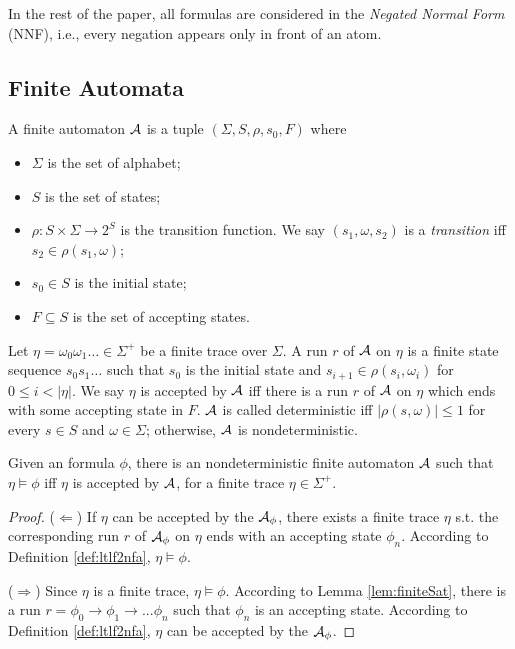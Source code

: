 In the rest of the paper, all \ltlf formulas are considered in the \emph{Negated Normal Form} (NNF), i.e., every negation appears only in front of an atom. 

\subsection{Finite Automata}
\noindent A finite automaton $\mathcal{A}$ is a tuple $(\Sigma, S, \rho, s_0, F)$ where 
\begin{itemize}
	\item $\Sigma$ is the set of alphabet;
	\item $S$ is the set of states;
	\item $\rho: S\times\Sigma \rightarrow 2^S$ is the transition function. We say $(s_1,\omega, s_2)$ is a \emph{transition} iff $s_2\in\rho(s_1,\omega)$;
	\item $s_0\in S$ is the initial state;
	\item $F\subseteq S$ is the set of accepting states. 
\end{itemize}
Let $\eta=\omega_0\omega_1\ldots\in\Sigma^+$ be a finite trace over $\Sigma$. A run $r$ of $\mathcal{A}$ on $\eta$ is a finite state sequence $s_0 s_1\ldots$ such that $s_0$ is the initial state and $s_{i+1}\in\rho(s_i,\omega_i)$ for $0\leq i < |\eta|$. We say $\eta$ is accepted by $\mathcal{A}$ iff there is a run $r$ of $\mathcal{A}$ on $\eta$ which ends with some accepting state in $F$. $\mathcal{A}$ is called deterministic iff $|\rho(s,\omega)| \leq 1$ for every $s\in S$ and $\omega\in\Sigma$; otherwise, $\mathcal{A}$ is nondeterministic.   

\begin{theorem}[\cite{GV13}]
Given an \ltlf formula $\phi$, there is an nondeterministic finite automaton $\mathcal{A}$ such that $\eta\models\phi$ iff $\eta$ is accepted by $\mathcal{A}$, for a finite trace $\eta\in\Sigma^+$.
\end{theorem}
\begin{proof} 
($\Leftarrow$) If $\eta$ can be accepted by the \NFA $\mathcal{A}_{\phi}$, there exists a finite trace $\eta$ s.t. the corresponding run $r$ of $\mathcal{A}_{\phi}$ on $\eta$ ends with an accepting state $\phi_n$. According to Definition \ref{def:ltlf2nfa}, $\eta \models \phi$. 

($\Rightarrow$) Since $\eta$ is a finite trace, $\eta \models \phi$. According to Lemma \ref{lem:finiteSat}, there is a run $r= \phi_0 \to \phi_1 \to ...\phi_n$ such that $\phi_n$ is an accepting state. According to Definition \ref{def:ltlf2nfa}, $\eta$ can be accepted by the \NFA $\mathcal{A}_{\phi}$.
\end{proof}

